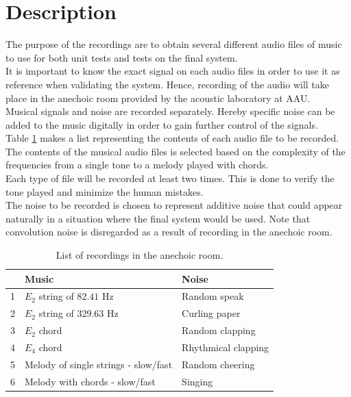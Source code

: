 \section{Description}  
The purpose of the recordings are to obtain several different audio files of music to use for both unit tests and tests on the final system. \\
It is important to know the exact signal on each audio files in order to use it as reference when validating the system. Hence, recording of the audio will take place in the anechoic room provided by the acoustic laboratory at AAU. \\
Musical signals and noise are recorded separately. Hereby specific noise can be added to the music digitally in order to gain further control of the signals. \\
Table \ref{tab:audio} makes a list representing the contents of each audio file to be recorded. The contents of the musical audio files is selected based on the complexity of the frequencies from a single tone to a melody played with chords. \\
Each type of file will be recorded at least two times. This is done to verify the tone played and minimize the human mistakes.    \\
The noise to be recorded is chosen to represent additive noise that could appear naturally in a situation where the final system would be used. Note that convolution noise is disregarded as a result of recording in the anechoic room.

\begin{table}[H]
\centering
\begin{tabular}{l|l|l}
\hline
  & \textbf{Music}                      & \textbf{Noise}     \\ \hline
1 & $E_2$ string of $82.41$ Hz			& Random speak       \\ \hline
2 & $E_2$ string of $329.63$ Hz			& Curling paper      \\ \hline
3 & $E_2$ chord                         & Random clapping    \\ \hline
4 & $E_4$ chord                 		& Rhythmical clapping \\ \hline
5 & Melody of single strings - slow/fast & Random cheering    \\ \hline
6 & Melody with chords - slow/fast      & Singing            \\ \hline
\end{tabular}
\caption{List of recordings in the anechoic room.}
\label{tab:audio}
\end{table}

